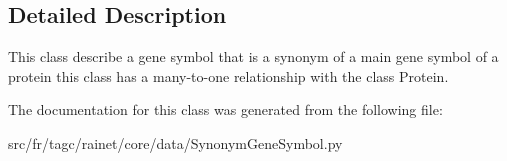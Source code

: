 \subsection{Detailed Description}
This class describe a gene symbol that is a synonym of a main gene symbol of a protein this class has a many-\/to-\/one relationship with the class Protein. 

The documentation for this class was generated from the following file\-:\begin{DoxyCompactItemize}
\item 
src/fr/tagc/rainet/core/data/Synonym\-Gene\-Symbol.\-py\end{DoxyCompactItemize}
